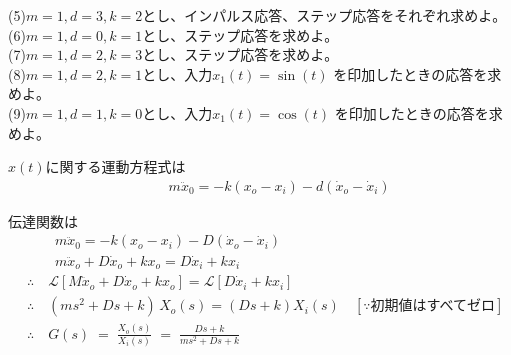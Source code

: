 \documentclass[a4paper,12pt]{article}
\begin{document}
\indent
(5)\quad \( m=1,d=3,k=2\)とし、インパルス応答、ステップ応答をそれぞれ求めよ。\\

\indent
(6)\quad \( m=1,d=0,k=1\)とし、ステップ応答を求めよ。\\

\indent
(7)\quad \( m=1,d=2,k=3\)とし、ステップ応答を求めよ。\\

\indent
(8)\quad \( m=1,d=2,k=1\)とし、入力\(x_1(t)=\sin (t)\) を印加したときの応答を求めよ。\\

\indent
(9)\quad \( m=1,d=1,k=0\)とし、入力\(x_1(t)=\cos (t)\) を印加したときの応答を求めよ。\\

\begin{tcolorbox}[title={7.(1)システムの運動方程式を求めよ。
    }]
    \(x(t)\)に関する運動方程式は
    \begin{align*}
        &\qquad m\ddot{x}_0 = -k(x_o - x_i)  - d (\dot{x}_o - \dot{x}_i)
    \end{align*}
\end{tcolorbox}
\begin{tcolorbox}[title={7.(2)システムの伝達関数を求めよ。
    }]
    伝達関数は
    \begin{align*}
        &\qquad m\ddot{x}_0 = -k(x_o - x_i)  - D (\dot{x}_o - \dot{x}_i) \\
        &\qquad m\ddot{x}_o + D \dot{x}_o + kx_o =  D \dot{x}_i + kx_i \\
        &\therefore \quad \mathcal{L} \left[ M\ddot{x}_o + D \dot{x}_o + kx_o \right] 
        =\mathcal{L} \left[ D \dot{x}_i + kx_i \right] \\
        &\therefore \quad (m s^2 + D s + k)\,X_o(s) =(D s + k)X_i(s) \quad [\because \text{初期値はすべてゼロ}]\\
        &\therefore \quad G(s) \;=\;\frac{X_o(s)}{X_i(s)}
        \;=\;\frac{D s + k}{m s^2 + D s + k}
    \end{align*}
\end{tcolorbox}
\end{document}
